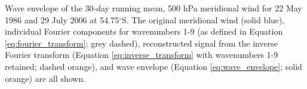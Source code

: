 \label{fig:example_hilbert}
Wave envelope of the 30-day running mean, 500 hPa meridional wind for 22 May 1986 and 29 July 2006 at 54.75$^{\circ}$S. The original meridional wind (solid blue), individual Fourier components for wavenumbers 1-9 (as defined in Equation \ref{eq:fourier_transform}; grey dashed), reconstructed signal from the inverse Fourier transform (Equation \ref{eq:inverse_transform} with wavenumbers 1-9 retained; dashed orange), and wave envelope (Equation \ref{eq:wave_envelope}; solid orange) are all shown.
    
    